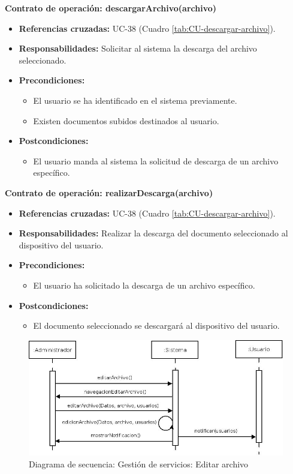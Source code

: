 \textbf{Contrato de operación: descargarArchivo(archivo)}
\begin{itemize}
\item \textbf{Referencias cruzadas:} UC-38 (Cuadro \ref{tab:CU-descargar-archivo}).
\item \textbf{Responsabilidades:} Solicitar al sistema la descarga del archivo seleccionado.
\item \textbf{Precondiciones:} 
 \begin{itemize}
\item El usuario se ha identificado en el sistema previamente.
\item Existen documentos subidos destinados al usuario.
\end {itemize}
\item \textbf{Postcondiciones:} 
 \begin{itemize}
\item El usuario manda al sistema la solicitud de descarga de un archivo específico.
\end {itemize}
\end {itemize}

\textbf{Contrato de operación: realizarDescarga(archivo)}
\begin{itemize}
\item \textbf{Referencias cruzadas:} UC-38 (Cuadro \ref{tab:CU-descargar-archivo}).
\item \textbf{Responsabilidades:} Realizar la descarga del documento seleccionado al dispositivo del usuario.
\item \textbf{Precondiciones:} 
 \begin{itemize}
\item El usuario ha solicitado la descarga de un archivo específico.
\end {itemize}
\item \textbf{Postcondiciones:} 
 \begin{itemize}
\item El documento seleccionado se descargará al dispositivo del usuario.
\end {itemize}
\end {itemize}


\vspace{10mm}

\begin{figure}[H]
\centering
  \includegraphics[scale=.50]{img/secuencias/gestion-servicios-editar-archivo.jpeg}
  \caption{Diagrama de secuencia: Gestión de servicios: Editar archivo}
  \label{fig:secuencia-gestion-servicios-editar-archivo}
\end{figure}

